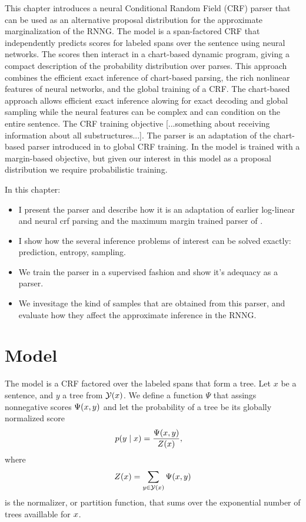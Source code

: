 % 

This chapter introduces a neural Conditional Random Field (CRF) parser that can be used as an alternative proposal distribution for the approximate marginalization of the RNNG. The model is a span-factored CRF that independently predicts scores for labeled spans over the sentence using neural networks. The scores then interact in a chart-based dynamic program, giving a compact description of the probability distribution over parses. This approach combines the efficient exact inference of chart-based parsing, the rich nonlinear features of neural networks, and the global training of a CRF. The chart-based approach allows efficient exact inference alowing for exact decoding and global sampling while the neural features can be complex and can condition on the entire sentence. The CRF training objective [...something about receiving information about all substructures...]. The parser is an adaptation of the chart-based parser introduced in \citet{stern2017minimal} to global CRF training. In \citet{stern2017minimal} the model is trained with a margin-based objective, but given our interest in this model as a proposal distribution we require probabilistic training.

In this chapter:
\begin{itemize}
  \item I present the parser and describe how it is an adaptation of earlier log-linear and neural crf parsing \citep{finkel2008crf,klein2015crf} and the maximum margin trained parser of \citet{stern2017minimal}.
  \item I show how the several inference problems of interest can be solved exactly: prediction, entropy, sampling.
  \item We train the parser in a supervised fashion and show it's adequacy as a parser.
  \item We invesitage the kind of samples that are obtained from this parser, and evaluate how they affect the approximate inference in the RNNG.
\end{itemize}

\section{Model}
  The model is a CRF factored over the labeled spans that form a tree. Let $x$ be a sentence, and $y$ a tree from $\mathcal{Y}(x)$. We define a function $\Psi$ that assings nonnegative scores $\Psi(x, y)$ and let the probability of a tree be its globally normalized score
  \begin{align}
    \label{eq:crf-model}
    p(y \mid x) &= \frac{\Psi(x, y)}{Z(x)},
  \end{align}
  where
  \begin{align*}
    Z(x) = \sum_{ y \in \mathcal{Y}(x) } \Psi(x, y)
  \end{align*}
  is the normalizer, or partition function, that sums over the exponential number of trees availlable for $x$.

